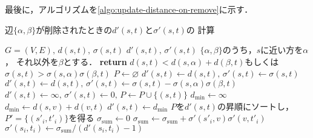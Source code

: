 最後に，アルゴリズムを\ref{algo:update-distance-on-remove}に示す．
\begin{algorithm}
  \caption{辺$\{\alpha,\beta\}$が削除されたときの$d'(s,t)$と$\sigma'(s,t)$の
  計算}\label{algo:update-distance-on-remove}
  \begin{algorithmic}[1]
    \Require $G=(V,E),\,d(s,t),\,\sigma(s,t)$
    \Ensure $d'(s,t),\,\sigma'(s,t)$
    \State $\{\alpha,\beta\}$のうち，$s$に近い方を$\alpha$，
    それ以外を$\beta$とする．
    \State \textbf{return} $d(s,t)<d(s,\alpha)+d(\beta,t)$もしくは
    $\sigma(s,t)>\sigma(s,\alpha)\sigma(\beta,t)$
    \EndProcedure
    \State $P\gets\varnothing$
    \State $d'(s,t)\gets d(s,t),\,\sigma'(s,t)\gets\sigma(s,t)$
    \State $d'(s,t)\gets d(s,t),\,\sigma'(s,t)\gets\sigma(s,t)
    -\sigma(s,\alpha)\sigma(\beta,t)$
    \Else{}
    \State $d'(s,t)\gets\infty,\,\sigma'(s,t)\gets0,\,P\gets P\cup\{(s,t)\}$
    \EndIf
    \EndFor
    \Comment{}
    \State $d_{\min}\gets\infty$
    \State $d_{\min}\gets d(s,v)+d(v,t)$
    \EndIf
    \EndIf
    \EndFor
    \State $d'(s,t)\gets d_{\min}$
    \EndFor
    \State $P$を$d'(s,t)$の昇順にソートし，$P'=\{(s'_i,t'_i)\}$を得る
    \State $\sigma_{\mathrm{sum}}\gets0$
    \State $\sigma_{\mathrm{sum}}\gets
    \sigma_{\mathrm{sum}}+\sigma'(s'_i,v)\sigma'(v,t'_i)$
    \EndIf
    \EndFor
    \State $\sigma'(s_i,t_i)\gets\sigma_{\mathrm{sum}}/(d'(s_i,t_i)-1)$
    \EndFor
    \EndProcedure
  \end{algorithmic}
\end{algorithm}

